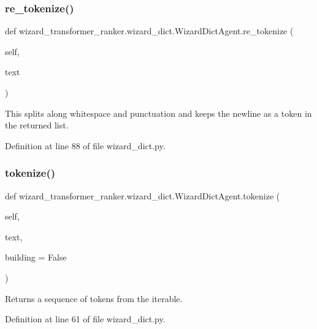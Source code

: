 \subsubsection{\texorpdfstring{re\+\_\+tokenize()}{re\_tokenize()}}
{\footnotesize\ttfamily def wizard\+\_\+transformer\+\_\+ranker.\+wizard\+\_\+dict.\+Wizard\+Dict\+Agent.\+re\+\_\+tokenize (\begin{DoxyParamCaption}\item[{}]{self,  }\item[{}]{text }\end{DoxyParamCaption})}

\begin{DoxyVerb}This splits along whitespace and punctuation and keeps the newline
as a token in the returned list.
\end{DoxyVerb}
 

Definition at line 88 of file wizard\+\_\+dict.\+py.

\mbox{\label{classwizard__transformer__ranker_1_1wizard__dict_1_1WizardDictAgent_a90fd8189d6fd3007d7ebd6ffac5104ed}} 
\subsubsection{\texorpdfstring{tokenize()}{tokenize()}}
{\footnotesize\ttfamily def wizard\+\_\+transformer\+\_\+ranker.\+wizard\+\_\+dict.\+Wizard\+Dict\+Agent.\+tokenize (\begin{DoxyParamCaption}\item[{}]{self,  }\item[{}]{text,  }\item[{}]{building = {\ttfamily False} }\end{DoxyParamCaption})}

\begin{DoxyVerb}Returns a sequence of tokens from the iterable.\end{DoxyVerb}
 

Definition at line 61 of file wizard\+\_\+dict.\+py.



